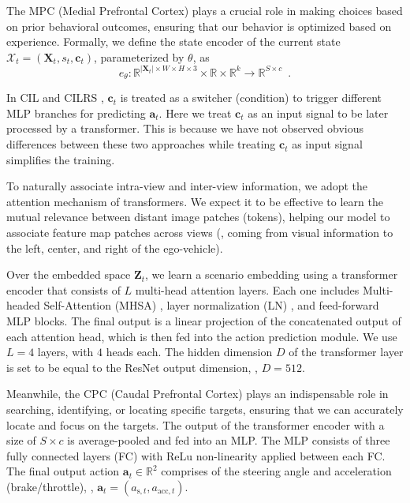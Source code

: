 The MPC (Medial Prefrontal Cortex) plays a crucial role in making choices based on prior behavioral outcomes, ensuring that our behavior is optimized based on experience.
Formally, we define the state encoder of the current state $\mathcal{X}_t=(\mathbf{X}_t, s_t, \mathbf{c}_t)$, parameterized by $\theta$, as
\begin{equation}\label{eq:encoder}
	e_{\theta}: \mathbb{R}^{|\mathbf{X}_{t}|\times W\times H\times3}\times\mathbb{R}\times \mathbb{R}^k \rightarrow \mathbb{R}^{S \times c} \enspace .
\end{equation}


In CIL \cite{Codevilla:2018} and CILRS \cite{Codevilla:2019}, $\mathbf{c}_{t}$ is treated as a switcher (condition) to trigger different MLP branches for predicting $\mathbf{a}_{t}$. 
Here we treat $\mathbf{c}_{t}$ as an input signal to be later processed by a transformer. 
This is because we have not observed obvious differences between these two approaches while treating $\mathbf{c}_{t}$ as input signal simplifies the training. 


To naturally associate intra-view and inter-view information, we adopt the attention mechanism of transformers\cite{Vaswani:2017}. 
We expect it to be effective to learn the mutual relevance between distant image patches (tokens), helping our model to associate feature map patches across views ({\ie}, coming from visual information to the left, center, and right of the ego-vehicle). 


Over the embedded space $\mathbf{Z}_{t}$, we learn a scenario embedding using a transformer encoder that consists of $L$ multi-head attention layers. 
Each one includes Multi-headed Self-Attention (MHSA) \cite{Vaswani:2017}, layer normalization (LN) \cite{Ba:2016}, and feed-forward MLP blocks.  
The final output is a linear projection of the concatenated output of each attention head, which is then fed into the action prediction module. We use $L=4$ layers, with $4$ heads each. 
The hidden dimension $D$ of the transformer layer is set to be equal to the ResNet output dimension, {\ie}, $D=512$. 


Meanwhile, the CPC (Caudal Prefrontal Cortex) plays an indispensable role in searching, identifying, or locating specific targets, ensuring that we can accurately locate and focus on the targets. 
The output of the transformer encoder with a size of $S\times c$ is average-pooled and fed into an MLP. 
The MLP consists of three fully connected layers (FC) with ReLu non-linearity applied between each FC. 
The final output action $\mathbf{a}_t\in\mathbb{R}^2$ comprises of the steering angle and acceleration (brake/throttle), {\ie}, $\mathbf{a}_{t} = (a_{\text{s},t}, a_{\text{acc}, t})$. 


